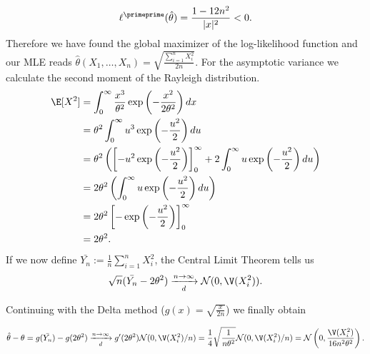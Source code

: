 \begin{solution}
\begin{enumerate}[label = (\alph*)]
  \begin{align*}
    \ell^{\primeprime}(\hat{\theta}) = \frac{1 - 12n^2}{|x|^2} < 0.
  \end{align*}
  Therefore we have found the global maximizer of the log-likelihood function
  and our MLE reads $\hat{\theta}(X_1,\dots,X_n) = 
  \sqrt{\frac{\sum_{i=1}^n X_i^2}{2n}}$.
  For the asymptotic variance we calculate the second moment of the Rayleigh distribution.
  \begin{align*}
    \E[X^2] &= \int_0^{\infty} \frac{x^3}{\theta^2}\exp\left(-\frac{x^2}{2\theta^2}\right) dx \\
    &= \theta^2 \int_0^{\infty} u^3\exp\left(-\frac{u^2}{2}\right) du \\
    &= \theta^2\left( \left[-u^2\exp\left(-\frac{u^2}{2}\right)\right]_0^\infty
    + 2 \int_0^{\infty} u \exp\left(-\frac{u^2}{2}\right) du\right) \\
    &= 2\theta^2\left(\int_0^{\infty} u \exp\left(-\frac{u^2}{2}\right) du\right) \\
    &= 2\theta^2\left[-\exp\left(-\frac{u^2}{2}\right)\right]_0^\infty \\
    &= 2\theta^2.
  \end{align*}
  If we now define $\bar{Y_n} := \frac{1}{n}\sum_{i=1}^n X_i^2$, the
  Central Limit Theorem tells us
  \begin{align*}
    \sqrt{n}(\bar{Y_n} - 2\theta^2) \xrightarrow[d]{n \to \infty} 
    \mathcal{N}(0,\V(X_i^2)).
  \end{align*}

  Continuing with the Delta method ($g(x) = \sqrt{\frac{x}{2n}}$) we finally
  obtain

  \begin{align*}
    \hat{\theta} - \theta = g(\bar{Y_n}) - g(2\theta^2)
    \xrightarrow[d]{n \to \infty} g'(2\theta^2)\mathcal{N}(0,\V(X_i^2)/n)
    = \frac{1}{4}\sqrt{\frac{1}{n\theta^2}}\mathcal{N}(0,\V(X_i^2)/n)
    = \mathcal{N}\left(0,\frac{\V(X_i^2)}{16n^2\theta^2}\right).
  \end{align*}

\end{enumerate}


\end{solution}


